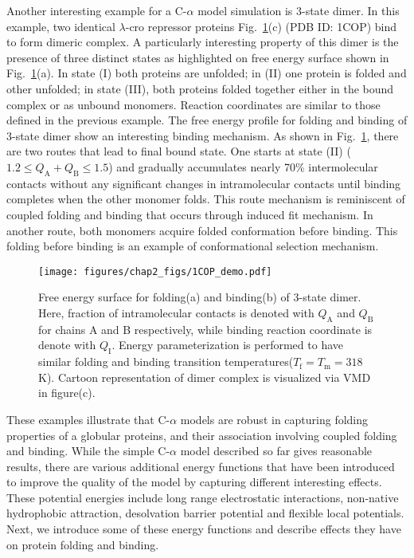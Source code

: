 \documentclass[../talant.diss.submit.tex]{subfiles}
\begin{document}
Another interesting example for a C-$\alpha$ model simulation is 3-state dimer.
In this example, two identical $\lambda$-cro repressor proteins
Fig.~\ref{fig:1COP_demo}(c) (PDB ID: 1COP) bind to form dimeric complex.  A
particularly interesting property of this dimer is the presence of three
distinct states as highlighted on free energy surface shown in
Fig.~\ref{fig:1COP_demo}(a).  In state (I) both proteins are unfolded; in (II)
one protein is folded and other unfolded; in state (III), both proteins folded
together either in the bound complex or as unbound monomers.  Reaction
coordinates are similar to those defined in the previous example.  The free energy
profile for folding and binding of 3-state dimer show an interesting binding
mechanism. As shown in Fig.~\ref{fig:1COP_demo}, there are two routes 
that lead to final bound state. One starts at state (II)
($1.2 \le Q_{\mathrm{A}}+Q_{\mathrm{B}} \le 1.5$) and  gradually accumulates nearly
70\% intermolecular contacts without any significant changes in intramolecular
contacts until binding completes when the other monomer folds.  This
route mechanism is reminiscent of coupled folding and binding that occurs through
induced fit mechanism.  In another route, both monomers acquire folded
conformation before binding.  This folding before binding is an example of
conformational selection mechanism.

\begin{figure}[htp!]
  \begin{centering}
    \texttt{[image: figures/chap2\_figs/1COP\_demo.pdf]}
    \caption{Free energy surface for folding(a) and binding(b) of 3-state dimer.
      Here, fraction of intramolecular contacts is denoted with
      $Q_{\mathrm{A}}$ and $Q_{\mathrm{B}}$ for chains A and B respectively, while
      binding reaction coordinate is denote with $Q_{\mathrm{I}}$.
      Energy parameterization is performed to have similar folding
      and binding transition temperatures($T_{\mathrm{f}} = T_{\mathrm{m}}=318$K).
      Cartoon representation of dimer complex is visualized via VMD in figure(c).}
    \label{fig:1COP_demo}
  \end{centering}
\end{figure}


These examples illustrate that C-$\alpha$ models are robust in capturing folding
properties of a globular proteins, and their association involving coupled folding
and binding.
While the simple C-$\alpha$ model described so far gives reasonable results,
there are various additional energy functions that have been introduced to improve
the quality of the model by capturing different interesting effects. These potential energies include
long range  electrostatic interactions, non-native hydrophobic attraction, desolvation barrier
potential and flexible local potentials. Next, we introduce some of these energy functions and
describe effects they have on protein folding and binding.
\end{document}
